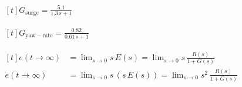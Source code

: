 \documentclass[multi={mymath,myarray},border=1pt]{standalone}
\newenvironment{myarray}{$\begin{aligned}[t]}{\end{aligned}$}
\begin{document}
\begin{myarray}
G_{\mathrm{surge}} = \frac{5.1}{1.3 \, s + 1}
\end{myarray}

\begin{myarray}
G_{\mathrm{yaw-rate}} = \frac{0.82}{0.61 \, s + 1}
\end{myarray}

\begin{myarray}
  e(t \rightarrow \infty) & = \lim_{s \rightarrow 0} s \, E(s) =
  \lim_{s \rightarrow 0} s \, \frac{R(s)}{1 + G(s)} \\
  \dot{e}(t \rightarrow \infty) & = \lim_{s \rightarrow 0} s \,(s \, E(s)) =
  \lim_{s \rightarrow 0} s^2 \, \frac{R(s)}{1 + G(s)} 
\end{myarray}
\end{document}
